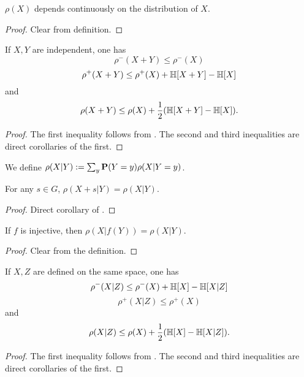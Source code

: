 \begin{lemma}\label{rho-cts} $\rho(X)$ depends continuously on the distribution of $X$.
\end{lemma}

\begin{proof}  Clear from definition.
\end{proof}

\begin{lemma}\label{rho-sums}  If $X,Y$ are independent, one has
  $$ \rho^-(X+Y) \leq \rho^-(X)$$
  $$ \rho^+(X+Y) \leq \rho^+(X) + \mathbb{H}[X+Y] - \mathbb{H}[X]$$
and
  $$ \rho(X+Y) \leq \rho(X) + \frac{1}{2}( \mathbb{H}[X+Y] - \mathbb{H}[X] ).$$
\end{lemma}

\begin{proof}
The first inequality follows from . The second and third inequalities are direct corollaries of the first.
\end{proof}


\begin{definition}\label{rho-cond-def}  We define $\rho(X|Y) := \sum_y {\bf P}(Y=y) \rho(X|Y=y)$.
\end{definition}

\begin{lemma}\label{rho-cond-invariant}
  For any $s\in G$, $\rho(X+s|Y)=\rho(X|Y)$.
\end{lemma}
\begin{proof}
  Direct corollary of .
\end{proof}

\begin{lemma}\label{rho-cond-relabeled}
  If $f$ is injective, then $\rho(X|f(Y))=\rho(X|Y)$.
\end{lemma}
\begin{proof}
  Clear from the definition.
\end{proof}

\begin{lemma}\label{rho-cond}  If $X,Z$ are defined on the same space, one has
  $$ \rho^-(X|Z) \leq \rho^-(X) + \mathbb{H}[X] - \mathbb{H}[X|Z]$$
  $$ \rho^+(X|Z) \leq \rho^+(X)$$
and
  $$ \rho(X|Z) \leq \rho(X) + \frac{1}{2}( \mathbb{H}[X] - \mathbb{H}[X|Z] ).$$
\end{lemma}

\begin{proof}
  The first inequality follows from . The second and third inequalities are direct corollaries of the first.
\end{proof}

